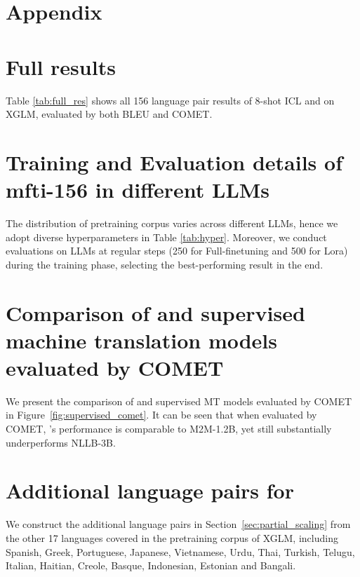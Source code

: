 \section*{Appendix}
\label{sec:appendix}





\section{Full results}
\label{appendix: full results}
Table \ref{tab:full_res} shows all 156 language pair results of 8-shot ICL and \method on XGLM, evaluated by both BLEU and COMET.


\section{Training and Evaluation details of mfti-156 in different LLMs}
\label{appendix:hyperparameters}

The distribution of pretraining corpus varies across different LLMs,  hence we adopt diverse hyperparameters in Table \ref{tab:hyper}. Moreover, we conduct evaluations on LLMs at regular steps (250 for Full-finetuning and 500 for Lora) during the training phase, selecting the best-performing result in the end.

\section{Comparison of \method and supervised machine translation models evaluated by COMET}
\label{sec:supervised_comet}
We present the comparison of \method and supervised MT models evaluated by COMET in Figure~\ref{fig:supervised_comet}. It can be seen that when evaluated by COMET, \methodend's performance is comparable to M2M-1.2B, yet still substantially underperforms NLLB-3B.



\section{Additional language pairs for \method}
\label{appendix:Additional language}

We construct the additional language pairs in Section~\ref{sec:partial_scaling} from the other 17 languages covered in the pretraining corpus of XGLM, including Spanish, Greek, Portuguese, Japanese, Vietnamese, Urdu, Thai, Turkish, Telugu, Italian, Haitian, Creole, Basque, Indonesian, Estonian and Bangali.




